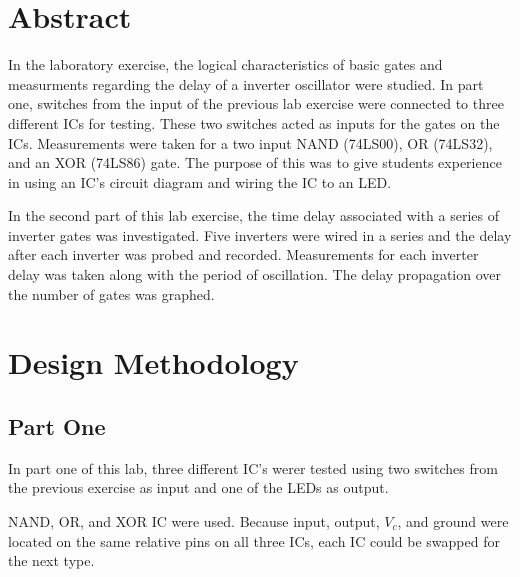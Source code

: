 \documentclass[CMPE]{KGCOEReport}
\begin{document}
\maketitle

\section*{Abstract}
In the laboratory exercise, the logical characteristics of basic gates and measurments regarding the delay of a inverter oscillator were studied. In part one, switches from the input of the previous lab exercise were connected to three different ICs for testing. These two switches acted as inputs for the gates on the ICs. Measurements were taken for a two input NAND (74LS00), OR (74LS32), and an XOR (74LS86) gate. The purpose of this was to give students experience in using an IC's circuit diagram and wiring the IC to an LED. \par 
In the second part of this lab exercise, the time delay associated with a series of inverter gates was investigated. Five inverters were wired in a series and the delay after each inverter was probed and recorded. Measurements for each inverter delay was taken along with the period of oscillation. The delay propagation over the number of gates was graphed.

\section*{Design Methodology}

\subsection*{Part One}
In part one of this lab, three different IC's werer tested using two switches from the previous exercise as input and one of the LEDs as output. \par
NAND, OR, and XOR IC were used. Because input, output, \(V_c\), and ground were located on the same relative pins on all three ICs, each IC could be swapped for the next type.
\end{document}
